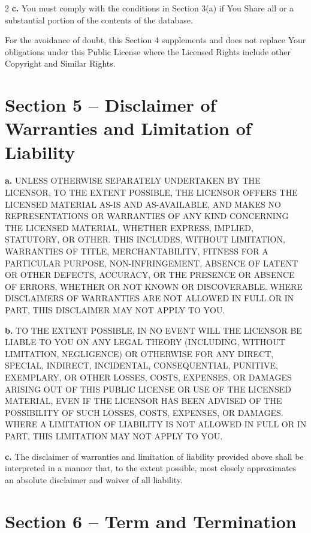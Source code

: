 \begin{multicols*}{2}
    \textbf{c.} You must comply with the conditions in Section 3(a) if You Share
    all or a substantial portion of the contents of the database.

    For the avoidance of doubt, this Section 4 supplements and does not
    replace Your obligations under this Public License where the Licensed
    Rights include other Copyright and Similar Rights.


    \section*{Section 5 -- Disclaimer of Warranties and Limitation of Liability}

    \textbf{a.} UNLESS OTHERWISE SEPARATELY UNDERTAKEN BY THE LICENSOR, TO THE
    EXTENT POSSIBLE, THE LICENSOR OFFERS THE LICENSED MATERIAL AS-IS AND
    AS-AVAILABLE, AND MAKES NO REPRESENTATIONS OR WARRANTIES OF ANY KIND
    CONCERNING THE LICENSED MATERIAL, WHETHER EXPRESS, IMPLIED, STATUTORY,
    OR OTHER. THIS INCLUDES, WITHOUT LIMITATION, WARRANTIES OF TITLE,
    MERCHANTABILITY, FITNESS FOR A PARTICULAR PURPOSE, NON-INFRINGEMENT,
    ABSENCE OF LATENT OR OTHER DEFECTS, ACCURACY, OR THE PRESENCE OR
    ABSENCE OF ERRORS, WHETHER OR NOT KNOWN OR DISCOVERABLE. WHERE
    DISCLAIMERS OF WARRANTIES ARE NOT ALLOWED IN FULL OR IN PART, THIS
    DISCLAIMER MAY NOT APPLY TO YOU.

    \textbf{b.} TO THE EXTENT POSSIBLE, IN NO EVENT WILL THE LICENSOR BE LIABLE
    TO YOU ON ANY LEGAL THEORY (INCLUDING, WITHOUT LIMITATION, NEGLIGENCE)
    OR OTHERWISE FOR ANY DIRECT, SPECIAL, INDIRECT, INCIDENTAL,
    CONSEQUENTIAL, PUNITIVE, EXEMPLARY, OR OTHER LOSSES, COSTS, EXPENSES,
    OR DAMAGES ARISING OUT OF THIS PUBLIC LICENSE OR USE OF THE LICENSED
    MATERIAL, EVEN IF THE LICENSOR HAS BEEN ADVISED OF THE POSSIBILITY OF
    SUCH LOSSES, COSTS, EXPENSES, OR DAMAGES. WHERE A LIMITATION OF
    LIABILITY IS NOT ALLOWED IN FULL OR IN PART, THIS LIMITATION MAY NOT
    APPLY TO YOU.

    \textbf{c.} The disclaimer of warranties and limitation of liability
    provided above shall be interpreted in a manner that, to the extent
    possible, most closely approximates an absolute disclaimer and waiver
    of all liability.


    \section*{Section 6 -- Term and Termination}


\end{multicols*}
